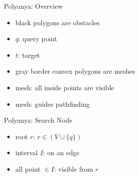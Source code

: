 \begin{frame}{Polyanya: Overview}

\begin{minipage}{.4\textwidth}
\begin{itemize}
    \item \small black polygons are obstacles
    \item \small $q$: query point
    \item \small $t$: target
    \item \small gray border convex polygons are meshes
    \item \small mesh: all inside points are visible
    \item \small mesh: guides pathfinding
\end{itemize}

\end{minipage}%
\begin{minipage}{.6\textwidth}
\begin{adjustbox}{max totalsize={.9\textwidth}{.9\textheight}, right}
\end{adjustbox}
\end{minipage}
\end{frame}

\begin{frame}{Polyanya: Search Node}

\begin{minipage}{.4\textwidth}
\begin{itemize}
    \item \small root $r$: $r \in (V \cup \{q\})$
    \item \small interval $I$: on an edge
    \item \small all point $\in I$: visible from $r$
\end{itemize}
\end{minipage}%
\begin{minipage}{.6\textwidth}
\begin{adjustbox}{max totalsize={.9\textwidth}{.9\textheight}, right}
\end{adjustbox}
\end{minipage}

\end{frame}


